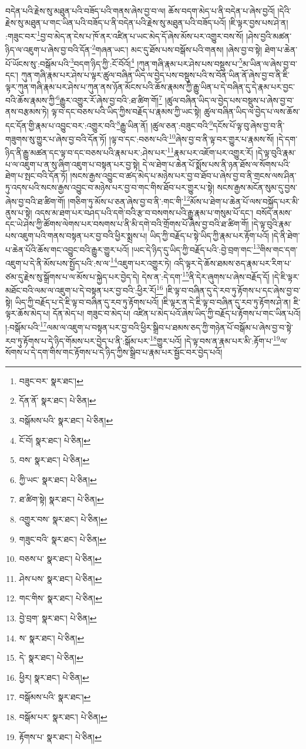 བདེན་པའི་རྗེས་སུ་མཐུན་པའི་བཟོད་པའི་གནས་ཞེས་བྱ་བ་ལ། ཆོས་བདག་མེད་པ་ནི་བདེན་པ་ཞེས་བྱའོ། །དེའི་རྗེས་སུ་མཐུན་པ་གང་ཡིན་པའི་བཟོད་པ་ནི་བདེན་པའི་རྗེས་སུ་མཐུན་པའི་བཟོད་པའོ། །ཇི་ལྟར་བྱས་པས་ཤེ་ན། :གཟུང་བར་\footnote{བཟུང་བར་  སྣར་ཐང་། }བྱ་བ་མེད་ན་ངེས་པ་ཁོ་ནར་འཛིན་པ་ཡང་མེད་དོ་ཞེས་མོས་པར་འགྱུར་བས་སོ། །ཤེས་བྱའི་མཚན་ཉིད་ལ་འཇུག་པ་ཞེས་བྱ་བའི་དོན་\footnote{དོན་ནོ་  སྣར་ཐང་།  པེ་ཅིན། }གཞན་ཡང་། མང་དུ་ཐོས་པས་བསྒོས་པའི་གནས། །ཞེས་བྱ་བ་སྟེ། ཐེག་པ་ཆེན་པོ་ཡོངས་སུ་:བསྒོམ་པའི་\footnote{བསྒོམས་པའི་  སྣར་ཐང་།  པེ་ཅིན། }བདག་ཉིད་ཀྱི་:ངོ་བོའོ།\footnote{ངོ་བོ།  སྣར་ཐང་།  པེ་ཅིན། } །ཀུན་གཞི་རྣམ་པར་ཤེས་པས་བསྡུས་པ་\footnote{བས་  སྣར་ཐང་།  པེ་ཅིན། }མ་ཡིན་ལ་ཞེས་བྱ་བ་དང་། ཀུན་གཞི་རྣམ་པར་ཤེས་པ་ལྟར་ཚུལ་བཞིན་ཡིད་ལ་བྱེད་པས་བསྡུས་པའི་ས་བོན་ཡིན་ནོ་ཞེས་བྱ་བ་ནི་ཇི་ལྟར་ཀུན་གཞི་རྣམ་པར་ཤེས་པ་ཀུན་ནས་ཉོན་མོངས་པའི་ཆོས་རྣམས་ཀྱི་རྒྱུ་ཡིན་པ་དེ་བཞིན་དུ་དེ་རྣམ་པར་བྱང་བའི་ཆོས་རྣམས་ཀྱི་\footnote{ཀྱི་ཡང་  སྣར་ཐང་།  པེ་ཅིན། }རྒྱུར་འགྱུར་རོ་ཞེས་བྱ་བའི་:ཐ་ཚིག་གོ།\footnote{ཐ་ཚིག་སྟེ།  སྣར་ཐང་།  པེ་ཅིན། } །ཚུལ་བཞིན་ཡིད་ལ་བྱེད་པས་བསྡུས་པ་ཞེས་བྱ་བ་ནས་བརྩམས་ཏེ། ལྟ་བ་དང་བཅས་པའི་ཡིད་ཀྱིས་བརྗོད་པ་རྣམས་ཀྱི་ཡང་སྟེ། ཚུལ་བཞིན་ཡིད་ལ་བྱེད་པ་ལས་ཆོས་དང་དོན་གྱི་རྣམ་པ་འབྱུང་བར་:འགྱུར་བའི་\footnote{འགྱུར་བས་  སྣར་ཐང་།  པེ་ཅིན། }རྒྱུ་ཡིན་ནོ། །ཚུལ་ཅན་:བཟུང་བའི་\footnote{གཟུང་བའི་  སྣར་ཐང་།  པེ་ཅིན། }དངོས་པོ་ལྟ་བུ་ཞེས་བྱ་བ་ནི་གཟུགས་སུ་གྱུར་པ་ཞེས་བྱ་བའི་དོན་ཏོ། །ལྟ་བ་དང་:བཅས་པའི་\footnote{བཅས་པ་  སྣར་ཐང་།  པེ་ཅིན། }ཞེས་བྱ་བ་ནི་ལྟ་བར་གྱུར་པ་རྣམས་སོ། །དེ་དག་ཉིད་ནི་རྒྱུ་མཚན་དང་ལྟ་བ་དང་བཅས་པའི་རྣམ་པར་:ཤེས་པར་\footnote{ཤེས་པས་  སྣར་ཐང་།  པེ་ཅིན། }རྣམ་པར་འཇོག་པར་འགྱུར་རོ། །དེ་ལྟ་བུའི་རྣམ་པ་ལ་འཇུག་པ་ན་སུ་ཞིག་འཇུག་པ་བསྟན་པར་བྱ་སྟེ། དེ་ལ་ཐེག་པ་ཆེན་པོ་སྨོས་པས་ནི་ཉན་ཐོས་ལ་སོགས་པའི་ཐེག་པ་སྤང་བའི་དོན་ཏོ། །སངས་རྒྱས་འབྱུང་བ་ཚད་མེད་པ་མཉེས་པར་བྱ་བ་ཐོབ་པ་ཞེས་བྱ་བ་ནི་གྲངས་ལས་ཤིན་ཏུ་འདས་པའི་སངས་རྒྱས་འབྱུང་བ་མཉེས་པར་བྱ་བ་གང་གིས་ཐོབ་པར་གྱུར་པ་སྟེ། སངས་རྒྱས་མངོན་སུམ་དུ་བྱས་ཞེས་བྱ་བའི་ཐ་ཚིག་གོ། །གཅིག་ཏུ་མོས་པ་ཅན་ཞེས་བྱ་བ་ནི་:གང་གི་\footnote{གང་གིས་  སྣར་ཐང་།  པེ་ཅིན། }མོས་པ་ཐེག་པ་ཆེན་པོ་ལས་བསྐྱོད་པར་མི་ནུས་པ་སྟེ། འདས་མ་ཐག་པར་བཤད་པའི་དགེ་བའི་རྩ་བ་བསགས་པའི་རྒྱུ་རྣམ་པ་གསུམ་པོ་དང་། བསོད་ནམས་དང་ཡེ་ཤེས་ཀྱི་ཚོགས་ལེགས་པར་བསགས་པ་ནི་མི་དགེ་བའི་གྲོགས་པོ་ཞེས་བྱ་བའི་ཐ་ཚིག་གོ། །དེ་ལྟ་བུའི་རྣམ་པས་འཇུག་པའི་གནས་བསྟན་པར་བྱ་བའི་ཕྱིར་སྨྲས་པ། ཡིད་ཀྱི་བརྗོད་པ་སྟེ་ཡིད་ཀྱི་རྣམ་པར་རྟོག་པའོ། །དེ་ནི་ཐེག་པ་ཆེན་པོའི་ཆོས་གང་འབྱུང་བའི་རྒྱུར་གྱུར་པའོ། །ཡང་དེ་ཉིད་དུ་ཡིད་ཀྱི་བརྗོད་པའི་:བྱེ་བྲག་གང་\footnote{བྱེ་བྲག་  སྣར་ཐང་།  པེ་ཅིན། }གིས་གང་དག་འཇུག་པ་དེ་ནི་མོས་པས་སྤྱོད་པའི་:ས་ལ་\footnote{ས་  སྣར་ཐང་།  པེ་ཅིན། }འཇུག་པར་འགྱུར་ཏེ། འདི་ལྟར་དེ་ཆོས་ཐམས་ཅད་རྣམ་པར་རིག་པ་ཙམ་དུ་རྗེས་སུ་སྒྲོགས་པ་ལ་མོས་པ་སྐྱེད་པར་བྱེད་དེ། དེས་ན་:དེ་དག་\footnote{དེ་  སྣར་ཐང་།  པེ་ཅིན། }ནི་དེར་ཞུགས་པ་ཞེས་བརྗོད་དོ། །དེ་ཇི་ལྟར་མཐོང་བའི་ལམ་ལ་འཇུག་པ་དེ་བསྟན་པར་བྱ་བའི་:ཕྱིར་རོ།\footnote{ཕྱིར།  སྣར་ཐང་།  པེ་ཅིན། } །ཇི་ལྟ་བ་བཞིན་དུ་དེ་རབ་ཏུ་རྟོགས་པ་དང་ཞེས་བྱ་བ་སྟེ། ཡིད་ཀྱི་བརྗོད་པ་དེ་ཇི་ལྟ་བ་བཞིན་དུ་རབ་ཏུ་རྟོགས་པའོ། །ཇི་ལྟར་ན་དེ་ཇི་ལྟ་བ་བཞིན་དུ་རབ་ཏུ་རྟོགས་ཤེ་ན། ཇི་ལྟར་ཆོས་མེད་པ། དོན་མེད་པ། གཟུང་བ་མེད་པ། འཛིན་པ་མེད་པའོ་ཞེས་ཡིད་ཀྱི་བརྗོད་པ་རྟོགས་པ་གང་ཡིན་པའོ། །:བསྒོམ་པའི་\footnote{བསྒོམས་པའི་  སྣར་ཐང་། }ལམ་ལ་འཇུག་པ་བསྟན་པར་བྱ་བའི་ཕྱིར་སྒྲིབ་པ་ཐམས་ཅད་ཀྱི་གཉེན་པོ་བསྒོམ་པ་ཞེས་བྱ་བ་སྟེ་རབ་ཏུ་རྟོགས་པ་དེ་ཉིད་གོམས་པར་བྱེད་པ་ནི་:སྒོམ་པར་\footnote{བསྒོམ་པར་  སྣར་ཐང་།  པེ་ཅིན། }གྱུར་པའོ། །དེ་ལྟ་བས་ན་རྣམ་པར་མི་:རྟོག་པ་\footnote{རྟོགས་པ་  སྣར་ཐང་།  པེ་ཅིན། }ལ་སོགས་པ་དེ་དག་གིས་གང་རྟོགས་པ་དེ་ཉིད་ཀྱིས་སྒྲིབ་པ་རྣམ་པར་སྦྱོང་བར་བྱེད་པའོ། 